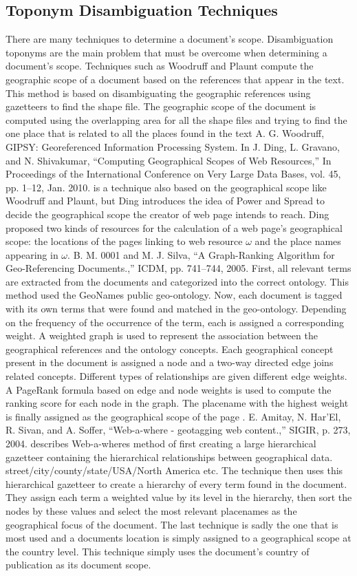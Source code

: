\documentclass[10pt, conference, compsocconf]{IEEEtran}
\begin{document}
\subsection{Toponym Disambiguation Techniques}
There are many techniques to determine a document's scope. Disambiguation toponyms are the main problem that must be overcome when determining a document's scope. Techniques such as Woodruff and Plaunt compute the geographic scope of a document based on the references that appear in the text. This method is based on disambiguating the geographic references using gazetteers to find the shape file. The geographic scope of the document is computed using the overlapping area for all the shape files and trying to find the one place that is related to all the places found in the text \cite{Woodruff:1993wh} A. G. Woodruff, GIPSY: Georeferenced Information Processing System. In \cite{Ding:1910wl} J. Ding, L. Gravano, and N. Shivakumar, “Computing Geographical Scopes of Web Resources,” In Proceedings of the International Conference on Very Large Data Bases, vol. 45, pp. 1–12, Jan. 2010. is a technique also based on the geographical scope like Woodruff and Plaunt, but Ding introduces the idea of Power and Spread to decide the geographical scope the creator of web page intends to reach. Ding proposed two kinds of resources for the calculation of a web page’s geographical scope: the locations of the pages linking to web resource \(ω\) and the place names appearing in \(ω\). \cite{:2005dm} B. M. 0001 and M. J. Silva, “A Graph-Ranking Algorithm for Geo-Referencing Documents.,” ICDM, pp. 741–744, 2005. First, all relevant terms are extracted from the documents and categorized into the correct ontology. This method used the GeoNames public geo-ontology. Now, each document is tagged with its own terms that were found and matched in the geo-ontology. Depending on the frequency of the occurrence of the term, each is assigned a corresponding weight. A weighted graph is used to represent the association between the geographical references and the ontology concepts. Each geographical concept present in the document is assigned a node and a two-way directed edge joins related concepts. Different types of relationships are given different edge weights. A PageRank formula based on edge and node weights is used to compute the ranking score for each node in the graph. The placename with the highest weight is finally assigned as the geographical scope of the page \cite{:2005dm}. \cite{Amitay:2004ju} E. Amitay, N. Har'El, R. Sivan, and A. Soffer, “Web-a-where - geotagging web content.,” SIGIR, p. 273, 2004. describes Web-a-wheres method of first creating a large hierarchical gazetteer containing the hierarchical relationships between geographical data. street/city/county/state/USA/North America etc. The technique then uses this hierarchical gazetteer to create a hierarchy of every term found in the document. They assign each term a weighted value by its level in the hierarchy, then sort the nodes by these values and select the most relevant placenames as the geographical focus of the document. The last technique is sadly the one that is most used and a documents location is simply assigned to a geographical scope at the country level. This technique simply uses the document's country of publication as its document scope.
\end{document}
